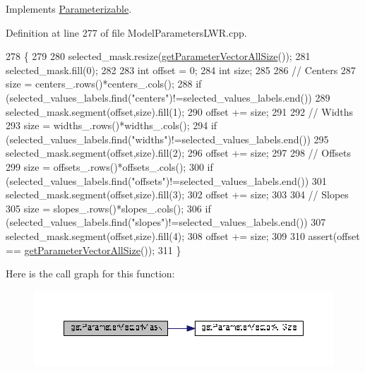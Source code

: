 Implements \hyperlink{classDmpBbo_1_1Parameterizable_ae7f6cbc5723ed4734ded5f2ba59bd366}{Parameterizable}.



Definition at line 277 of file Model\+Parameters\+L\+W\+R.\+cpp.


\begin{DoxyCode}
278 \{
279 
280   selected\_mask.resize(\hyperlink{classDmpBbo_1_1ModelParametersLWR_ab24d2485b3b795b516f4844f225100eb}{getParameterVectorAllSize}());
281   selected\_mask.fill(0);
282   
283   \textcolor{keywordtype}{int} offset = 0;
284   \textcolor{keywordtype}{int} size;
285   
286   \textcolor{comment}{// Centers}
287   size = centers\_.rows()*centers\_.cols();
288   \textcolor{keywordflow}{if} (selected\_values\_labels.find(\textcolor{stringliteral}{"centers"})!=selected\_values\_labels.end())
289     selected\_mask.segment(offset,size).fill(1);
290   offset += size;
291   
292   \textcolor{comment}{// Widths}
293   size = widths\_.rows()*widths\_.cols();
294   \textcolor{keywordflow}{if} (selected\_values\_labels.find(\textcolor{stringliteral}{"widths"})!=selected\_values\_labels.end())
295     selected\_mask.segment(offset,size).fill(2);
296   offset += size;
297   
298   \textcolor{comment}{// Offsets}
299   size = offsets\_.rows()*offsets\_.cols();
300   \textcolor{keywordflow}{if} (selected\_values\_labels.find(\textcolor{stringliteral}{"offsets"})!=selected\_values\_labels.end())
301     selected\_mask.segment(offset,size).fill(3);
302   offset += size;
303 
304   \textcolor{comment}{// Slopes}
305   size = slopes\_.rows()*slopes\_.cols();
306   \textcolor{keywordflow}{if} (selected\_values\_labels.find(\textcolor{stringliteral}{"slopes"})!=selected\_values\_labels.end())
307     selected\_mask.segment(offset,size).fill(4);
308   offset += size;
309 
310   assert(offset == \hyperlink{classDmpBbo_1_1ModelParametersLWR_ab24d2485b3b795b516f4844f225100eb}{getParameterVectorAllSize}());   
311 \}
\end{DoxyCode}


Here is the call graph for this function\+:
\nopagebreak
\begin{figure}[H]
\begin{center}
\leavevmode
\includegraphics[width=350pt]{classDmpBbo_1_1ModelParametersLWR_a9dba1f93e426e7511630ec1ece4ace17_cgraph}
\end{center}
\end{figure}


